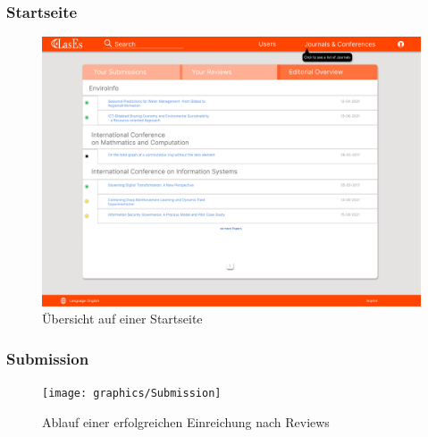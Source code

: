 \subsubsection{Startseite}

\begin{figure}[H]
	\centering
	\includegraphics[width=0.85\linewidth]{graphics/Homepage}
	\caption{Übersicht auf einer Startseite}
	\label{fig:homepageMockup}
\end{figure}

\subsubsection{Submission}

\begin{figure}[H]
	\centering
	\texttt{[image: graphics/Submission]}
	\caption{Ablauf einer erfolgreichen Einreichung nach Reviews}
	\label{fig:submission}
\end{figure}